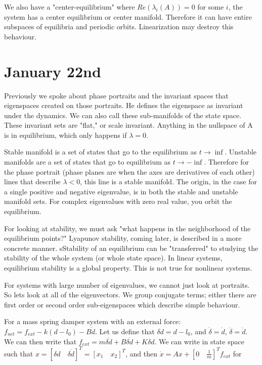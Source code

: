 \documentclass[11pt]{article}
\begin{document}
We also have a "center-equilibrium" where $Re(\lambda_i(A))=0$ for some $i$, the system has a center equilibrium or center manifold. Therefore it can have entire subspaces of equilibria and periodic orbits. Linearization may destroy this behaviour.


\section*{January 22nd}
Previously we spoke about phase portraits and the invariant spaces that eigenspaces created on those portraits. He defines the eigenspace as invariant under the dynamics. We can also call these sub-manifolds of the state space. These invariant sets are "flat," or scale invariant. Anything in the nullspace of A is in equilibrium, which only happens if $\lambda = 0$. 

Stable manifold is a set of states that go to the equilibrium as $t \to \inf$. Unstable manifolds are a set of states that go to equilibrium as $t \to -\inf$. Therefore for the phase portrait (phase planes are when the axes are derivatives of each other) lines that describe $\lambda < 0$, this line is a stable manifold. The origin, in the case for a single positive and negative eigenvalue, is in both the stable and unstable manifold sets. For complex eigenvalues with zero real value, you orbit the equilibrium.

For looking at stability, we must ask "what happens in the neighborhood of the equilibrium points?" Lyapunov stability, coming later, is described in a more concrete manner. sStability of an equilibrium can be "transferred" to studying the stability of the whole system (or whole state space). In linear systems, equilibrium stability is a global property. This is not true for nonlinear systems.

For systems with large number of eigenvalues, we cannot just look at portraits. So lets look at all of the eigenvectors. We group conjugate terms; either there are first order or second order sub-eigenspaces which describe simple behaviour.

For a mass spring damper system with an external force: $f_{net} =  f_{ext} - k(d-l_0) -B\dot{d}$. Let us define that $\delta d = d-l_0$, and $\dot{\delta}=\dot{d}$, $\ddot{\delta}=\ddot{d}$. We can then write that $f_{ext} = m\delta\ddot{d} + B\delta \dot{d} + K \delta d$. We can write in state space such that $x = [\delta d \quad \delta \dot{d}]^T = [x_1 \quad x_2]^T$, and then $\dot{x} = Ax + [0 \quad \frac{1}{m}]^Tf_{ext}$ for 
\end{document}
